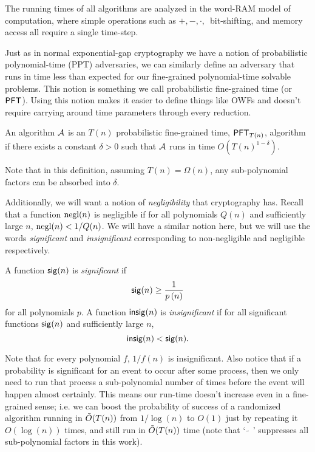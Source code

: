 
The running times of all algorithms are analyzed in the word-RAM model of computation, where simple operations such as $+, -, \cdot, \,$ bit-shifting, and memory access all require a single time-step.

Just as in normal exponential-gap cryptography we have a notion of probabilistic polynomial-time (PPT) adversaries, we can similarly define an adversary that runs in time less than expected for our fine-grained polynomial-time solvable problems. This notion is something we call probabilistic fine-grained time (or $\PFT{}$). Using this notion makes it easier to define things like OWFs and doesn't require carrying around time parameters through every reduction.

\begin{definition}
	An algorithm $\cA$ is an $T(n)$ probabilistic fine-grained time, $\PFT{T(n)}$, algorithm if there exists a constant $\delta > 0$ such that $\cA$ runs in time $O(T(n)^{1-\delta})$.
\end{definition}
Note that in this definition, assuming $T(n) = \Omega(n)$, any sub-polynomial factors can be absorbed into $\delta$.

Additionally, we will want a notion of \emph{negligibility} that cryptography has. Recall that a function $\negl(n)$ is negligible if for all polynomials $Q(n)$ and sufficiently large $n$, $\negl(n) < 1/Q(n)$. We will have a similar notion here, but we will use the words \emph{significant} and \emph{insignificant} corresponding to non-negligible and negligible respectively.


\begin{definition}
	A function $\sig(n)$ is \emph{significant} if 
	\[\sig(n) \ge \frac{1}{p\left(n\right)}\]
	for all polynomials $p$. A function $\insig(n)$ is \emph{insignificant} if for all significant functions $\sig(n)$ and sufficiently large $n$,
	\[\insig(n) < \sig(n).\]
\end{definition}

Note that for every polynomial $f$, $1/f(n)$ is insignificant. Also notice that if a probability is significant for an event to occur after some process, then we only need to run that process a sub-polynomial number of times before the event will happen almost certainly. This means our run-time doesn't increase even in a fine-grained sense; i.e. we can boost the probability of success of a randomized algorithm running in $\~O(T(n))$ from $1/\log(n)$ to $O(1)$ just by repeating it $O(\log(n))$ times, and still run in $\~O(T(n))$ time (note that ` $\tilde\ $ ' suppresses all sub-polynomial factors in this work).

